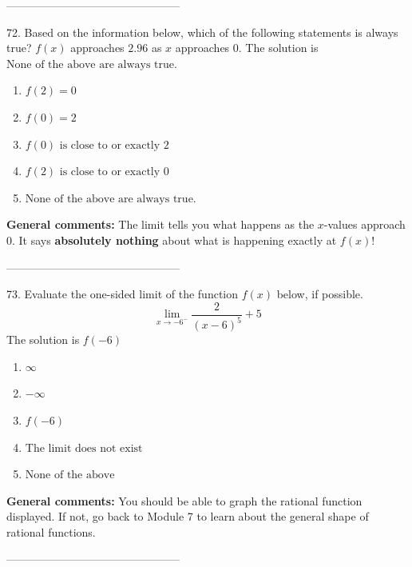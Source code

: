 \documentclass{extbook}[14pt]
\begin{document}
-----------------------------------------------

72. Based on the information below, which of the following statements is always true?
$f(x)$ approaches $2.96$ as $x$ approaches $0$. 
The solution is $ \text{None of the above are always true.} $ 

\begin{enumerate}[label=\Alph*.] 
\item $ f(2) = 0 $ 

  
\item $ f(0) = 2 $ 

  
\item $ f(0) \text{ is close to or exactly } 2 $ 

  
\item $ f(2) \text{ is close to or exactly } 0 $ 

  
\item $ \text{None of the above are always true.} $ 

  
\end{enumerate} 
 
\textbf{General comments:} The limit tells you what happens as the $x$-values approach $0$. It says \textbf{absolutely nothing} about what is happening exactly at $f(x)$!

-----------------------------------------------

73. Evaluate the one-sided limit of the function $f(x)$ below, if possible.
\[ \lim_{x \rightarrow -6^-} \frac{2}{(x-6)^5}+5 \] 
The solution is $ f(-6) $ 

\begin{enumerate}[label=\Alph*.] 
\item $ \infty $ 

  
\item $ -\infty $ 

  
\item $ f(-6) $ 

  
\item $ \text{The limit does not exist} $ 

  
\item $ \text{None of the above} $ 

  
\end{enumerate} 
 
\textbf{General comments:} You should be able to graph the rational function displayed. If not, go back to Module 7 to learn about the general shape of rational functions.

-----------------------------------------------
\end{document}
